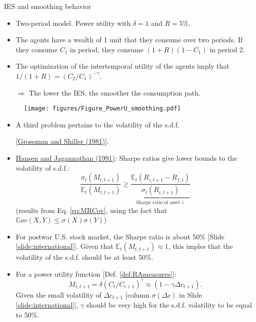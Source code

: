 \begin{frame}
\begin{scriptsize}
\begin{exampleblock}{IES and smoothing behavior}
\begin{itemize}
	\item Two-period model. Power utility with $\delta=1$ and $R=5\%$.
	\item The agents have a wealth of 1 unit that they consume over two periods. If they consume $C_1$ in period, they consume $(1+R)(1-C_1)$ in period 2.
	\item The optimization of the intertemporal utility of the agents imply that $1/(1+R)=(C_2/C_1)^{-\gamma}$.
	\item[$\Rightarrow$] The lower the IES, the smoother the consumption path.
\end{itemize}
		\begin{figure}
			\texttt{[image: figures/Figure\_PowerU\_smoothing.pdf]}
		\end{figure}
\end{exampleblock}
\end{scriptsize}
\end{frame}


\begin{frame}\label{slide:sharpepbm}
\begin{footnotesize}
\begin{itemize}
	\item A third problem pertains to the volatility of the s.d.f.
	
	[\href{https://www.jstor.org/stable/1815722?seq=1\#page_scan_tab_contents}{Grossman and Shiller (1981)}].
	\item \href{https://www.jstor.org/stable/2937680?seq=1\#page_scan_tab_contents}{Hansen and Jagannathan (1991)}: Sharpe ratios give lower bounds to the volatility of s.d.f.:
	$$
	\frac{\sigma_t(M_{t,t+1})}{\mathbb{E}_t(M_{t,t+1})} \ge \underbrace{\frac{\mathbb{E}_t(R_{i,t+1}-R_{f,t})}{\sigma_t(R_{i,t+1})}}_{\mbox{Sharpe ratio of asset $i$.}}
	$$
	(results from Eq. \ref{eq:MRCov}, using the fact that $\mathbb{C}ov(X,Y) \le \sigma(X)\sigma(Y)$)
	\item For postwar U.S. stock market, the Sharpe ratio is about 50\% [Slide \ref{slide:international}]. Given that $\mathbb{E}_t(M_{t,t+1}) \approx 1$, this imples that the volatility of the s.d.f. should be at least 50\%.
	\item For a power utility function [Def. \ref{def:RAmeasures}]:
	$$
	M_{t,t+1}=\delta (C_t/C_{t+1})^\gamma \approx (1 - \gamma \Delta c_{t+1}).
	$$
	Given the small volatility of $\Delta c_{t+1}$ [column $\sigma(\Delta c)$ in Slide \ref{slide:international}], $\gamma$ should be very high for the s.d.f. volatility to be equal to 50\%.
\end{itemize}
\end{footnotesize}
\end{frame}



